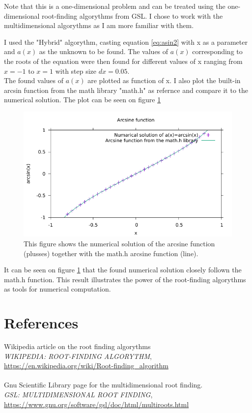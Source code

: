\documentclass{article}
\begin{document}
Note that this is a one-dimensional problem and can be treated using the one-dimensional root-finding algorythms from GSL. 
I chose to work with the multidimensional algorythms as I am more familiar with them.

I used the "Hybrid" algorythm, casting equation \ref{eq:asin2} with x as a parameter and $a(x)$ as the unknown to be found. 
The values of $a(x)$ corresponding to the roots of the equation were then found for different values of x 
ranging from $x=-1$ to $x=1$ with step size $dx=0.05$.
\\
The found values of $a(x)$ are plotted as function of x. 
I also plot the built-in arcsin function from the math library "math.h" as refernce and compare it to the numerical solution.
The plot can be seen on figure \ref{fig:1}  


\begin{figure}[h]
\label{fig:1}
\includegraphics[width=\linewidth]{arcsin.pdf}
\caption{This figure shows the numerical solution of the arcsine function (plusses) together with the math.h arcsine function (line). }
\end{figure} 

It can be seen on figure \ref{fig:1} that the found numerical solution closely follown the math.h function. This result illustrates
the power of the root-finding algorythms as tools for numerical computation. 

\clearpage
\section{References}
\begin{thebibliography}{99}
  Wikipedia article on the root finding algorythms\\
  \emph{WIKIPEDIA: ROOT-FINDING ALGORYTHM},\\
 \url{https://en.wikipedia.org/wiki/Root-finding_algorithm}\\
\\
  Gnu Scientific Library page for the multidimensional root finding.\\
  \emph{GSL: MULTIDIMENSIONAL ROOT FINDING},\\
 \url{https://www.gnu.org/software/gsl/doc/html/multiroots.html}\\

\end{thebibliography}
\end{document}
